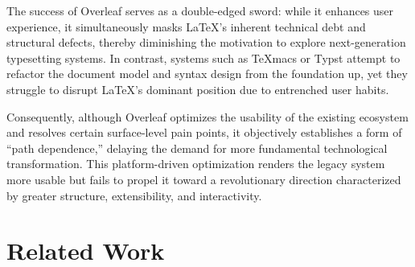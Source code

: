 The success of Overleaf serves as a double-edged sword: while it enhances user experience, it simultaneously masks \LaTeX{}'s inherent technical debt and structural defects, thereby diminishing the motivation to explore next-generation typesetting systems. In contrast, systems such as \TeX{}macs or Typst attempt to refactor the document model and syntax design from the foundation up, yet they struggle to disrupt \LaTeX{}'s dominant position due to entrenched user habits.

Consequently, although Overleaf optimizes the usability of the existing ecosystem and resolves certain surface-level pain points, it objectively establishes a form of ``path dependence,'' delaying the demand for more fundamental technological transformation. This platform-driven optimization renders the legacy system more usable but fails to propel it toward a revolutionary direction characterized by greater structure, extensibility, and interactivity.

\section{Related Work}
\label{app:rew}

